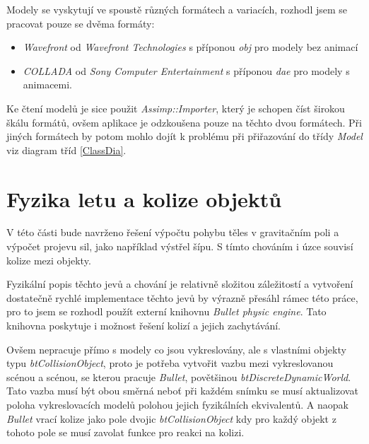  Modely se vyskytují ve spoustě různých formátech a variacích, rozhodl jsem se pracovat pouze se dvěma formáty:
\begin{itemize}
	\item \emph{Wavefront} od \emph{Wavefront Technologies} s příponou \emph{obj} pro modely bez animací
	\item \emph{COLLADA} od \emph{Sony Computer Entertainment} s příponou \emph{dae} pro modely s animacemi.
\end{itemize}

Ke čtení modelů je sice použit \emph{Assimp::Importer}, který je schopen číst širokou škálu formátů, ovšem aplikace je odzkoušena pouze na těchto dvou formátech. Při jiných formátech by potom mohlo dojít k problému při přiřazování do třídy \emph{Model} viz diagram tříd \ref{ClassDia}.
\section{Fyzika letu a kolize objektů}
V této části bude navrženo řešení výpočtu pohybu těles v gravitačním poli a výpočet projevu sil, jako například výstřel šípu. S tímto chováním i úzce souvisí kolize mezi objekty.

Fyzikální popis těchto jevů a chování je relativně složitou záležitostí a vytvoření dostatečně rychlé implementace těchto jevů by výrazně přesáhl rámec této práce, pro to jsem se rozhodl použít externí knihovnu \emph{Bullet physic engine}\cite{bullet}. Tato knihovna poskytuje i možnost řešení kolizí a jejich zachytávání.  

Ovšem nepracuje přímo s modely co jsou vykreslovány, ale s vlastními objekty typu \emph{btCollisionObject}, proto je potřeba vytvořit vazbu mezi vykreslovanou scénou a scénou, se kterou pracuje \emph{Bullet}, povětšinou \emph{btDiscreteDynamicWorld}. Tato vazba musí být obou směrná neboť při každém snímku se musí aktualizovat poloha vykreslovacích modelů polohou jejich fyzikálních ekvivalentů. A naopak \emph{Bullet} vrací kolize jako pole dvojic \emph{btCollisionObject} kdy pro každý objekt z tohoto pole se musí zavolat funkce pro reakci na kolizi. 

    

